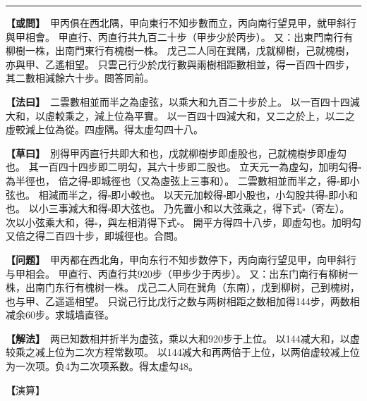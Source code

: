 \documentclass[11pt,a4paper]{article}
\let\origsquare\square
\renewcommand{\square}{\ensuremath{\origsquare}}%
\newcommand{\longline}{\noindent\rule{\textwidth}{0.4pt}}
\newcommand{\clOWEN}[1]{%
  \par\vspace{0.3em}%
  \noindent\textcolor{problemcolor}{\textbf{【或問】}}\,{\tradfont #1}\par\nopagebreak%
}
\newcommand{\mdOWEN}[1]{%
  \par\vspace{0.3em}%
  \noindent\textcolor{problemcolor}{\textbf{【问题】}}\,{\modfont #1}\par\nopagebreak%
}
\newcommand{\clFAYUE}[1]{%
  \par\noindent\textcolor{methodcolor}{\textbf{【法曰】}}\,{\tradfont #1}\par\nopagebreak%
}
\newcommand{\mdFAYUE}[1]{%
  \par\noindent\textcolor{methodcolor}{\textbf{【解法】}}\,{\modfont #1}\par\nopagebreak%
}
\newcommand{\clTSAOYUE}[1]{%
  \par\noindent\textcolor{workcolor}{\textbf{【草曰】}}\,{\tradfont #1}\par%
}
\newcommand{\mdTSAOYUE}[1]{%
  \par\noindent\textcolor{workcolor}{\textbf【演算】}}\,{\modfont #1}\par%
\begin{document}
\vspace{0.3cm}
\begin{center}\longline\end{center}

\begin{paracol}{2}

\begin{leftcolumn}
\clOWEN{%
甲丙俱在西北隅，甲向東行不知步數而立，丙向南行望見甲，就甲斜行與甲相會。
甲直行、丙直行共九百二十步（甲步少於丙步）。
又：出東門南行有柳樹一株，出南門東行有槐樹一株。
戊己二人同在巽隅，戊就柳樹，己就槐樹，亦與甲、乙遙相望。
只雲己行少於戊行數與兩樹相距數相並，得一百四十四步，其二數相減餘六十步。問答同前。}

\clFAYUE{%
二雲數相並而半之為虛弦，以乘大和九百二十步於上。
以一百四十四減大和，以虛較乘之，減上位為平實。
以一百四十四減大和，又二之於上，以二之虛較減上位為從。四虛隅。得太虛勾四十八。}

\clTSAOYUE{%
別得甲丙直行共即大和也，戊就柳樹步即虛股也，己就槐樹步即虛勾也。
其一百四十四步即二明勾，其六十步即二股也。
立天元一為虛勾，加明勾得$\square$為半徑也，
倍之得$\square$即城徑也（又為虛弦上三事和）。
二雲數相並而半之，得$\square$即小弦也。
相減而半之，得$\square$即小較也。
以天元加較得$\square$即小股也，小勾股共得$\square$即小和也。
以小三事減大和得$\square$即大弦也。
乃先置小和以大弦乘之，得下式$\square$（寄左）。
次以小弦乘大和，得$\square$，與左相消得下式$\square$。
開平方得四十八步，即虛勾也。加明勾又倍之得二百四十步，即城徑也。合問。}
\end{leftcolumn}

\switchcolumn

\begin{rightcolumn}
\mdOWEN{%
甲丙都在西北角，甲向东行不知步数停下，丙向南行望见甲，向甲斜行与甲相会。
甲直行、丙直行共920步（甲步少于丙步）。
又：出东门南行有柳树一株，出南门东行有槐树一株。
戊己二人同在巽角（东南），戊到柳树，己到槐树，也与甲、乙遥遥相望。
只说己行比戊行之数与两树相距之数相加得144步，两数相减余60步。求城墙直径。}

\mdFAYUE{%
两已知数相并折半为虚弦，乘以大和920步于上位。
以144减大和，以虚较乘之减上位为二次方程常数项。
以144减大和再两倍于上位，以两倍虚较减上位为一次项。负4为二次项系数。得太虚勾48。}

\mdTSAOYUE{%
辨识得：甲丙直行共即大和，戊到柳树步即虚股，己到槐树步即虚勾。
144步即两倍明勾，60步即两倍股。
设天元一为虚勾，加明勾得$\square$为半径，
翻倍得$\square$即城径（又为虚弦上三事和）。
两已知数相并折半得$\square$即小弦。
相减折半得$\square$即小较。
天元加较得$\square$即小股，小勾股共得$\square$即小和。
以小三事减大和得$\square$即大弦。
先置小和以大弦乘之得下式$\square$（寄左）。
次以小弦乘大和得$\square$，与左式相消得下式$\square$。
开平方得48步即虚勾。加明勾再翻倍得240步即城径。符合所问。}
\end{rightcolumn}

\end{paracol}
\end{document}
